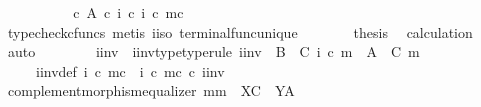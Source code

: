 \begin{isabellebody}
\ \ \ \ \isamarkupfalse%
\ \isamarkupfalse%
\ {\isachardoublequoteopen}{\isachardot}{\kern0pt}{\isachardot}{\kern0pt}{\isachardot}{\kern0pt}\ {\isacharequal}{\kern0pt}\ {\isasymf}\ {\isasymcirc}\isactrlsub c\ {\isasymbeta}\isactrlbsub A\isactrlesub \ {\isasymcirc}\isactrlsub c\ {\isacharparenleft}{\kern0pt}i\isactrlbold {\isasyminverse}\ {\isasymcirc}\isactrlsub c\ {\isacharparenleft}{\kern0pt}i\ {\isasymcirc}\isactrlsub c\ m{\isacharparenright}{\kern0pt}\isactrlsup c{\isacharparenright}{\kern0pt}{\isachardoublequoteclose}\isanewline
\ \ \ \ \ \ \isamarkupfalse%
\ {\isacharparenleft}{\kern0pt}typecheck{\isacharunderscore}{\kern0pt}cfuncs{\isacharcomma}{\kern0pt}\ metis\ i{\isacharunderscore}{\kern0pt}iso\ terminal{\isacharunderscore}{\kern0pt}func{\isacharunderscore}{\kern0pt}unique{\isacharparenright}{\kern0pt}\isanewline
\ \ \ \ \isamarkupfalse%
\ \isamarkupfalse%
\ {\isacharquery}{\kern0pt}thesis\ \isamarkupfalse%
\ calculation\ \isamarkupfalse%
\ auto\isanewline
\ \ \isamarkupfalse%
\isanewline
\ \ \isamarkupfalse%
\ \isamarkupfalse%
\ i{\isacharprime}{\kern0pt}{\isacharunderscore}{\kern0pt}inv\ \ i{\isacharprime}{\kern0pt}{\isacharunderscore}{\kern0pt}inv{\isacharunderscore}{\kern0pt}type{\isacharbrackleft}{\kern0pt}type{\isacharunderscore}{\kern0pt}rule{\isacharbrackright}{\kern0pt}{\isacharcolon}{\kern0pt}\ {\isachardoublequoteopen}i{\isacharprime}{\kern0pt}{\isacharunderscore}{\kern0pt}inv\ {\isacharcolon}{\kern0pt}\ B\ {\isasymsetminus}\ {\isacharparenleft}{\kern0pt}C{\isacharcomma}{\kern0pt}\ i\ {\isasymcirc}\isactrlsub c\ m{\isacharparenright}{\kern0pt}\ {\isasymrightarrow}\ A\ {\isasymsetminus}\ {\isacharparenleft}{\kern0pt}C{\isacharcomma}{\kern0pt}\ m{\isacharparenright}{\kern0pt}{\isachardoublequoteclose}\isanewline
\ \ \ \ \ i{\isacharprime}{\kern0pt}{\isacharunderscore}{\kern0pt}inv{\isacharunderscore}{\kern0pt}def{\isacharcolon}{\kern0pt}\ {\isachardoublequoteopen}{\isacharparenleft}{\kern0pt}i\ {\isasymcirc}\isactrlsub c\ m{\isacharparenright}{\kern0pt}\isactrlsup c\ {\isacharequal}{\kern0pt}\ {\isacharparenleft}{\kern0pt}i\ {\isasymcirc}\isactrlsub c\ m\isactrlsup c{\isacharparenright}{\kern0pt}\ {\isasymcirc}\isactrlsub c\ i{\isacharprime}{\kern0pt}{\isacharunderscore}{\kern0pt}inv{\isachardoublequoteclose}\isanewline
\ \ \ \ \isamarkupfalse%
\ complement{\isacharunderscore}{\kern0pt}morphism{\isacharunderscore}{\kern0pt}equalizer{\isacharbrackleft}{\kern0pt}\ m{\isacharequal}{\kern0pt}{\isachardoublequoteopen}m{\isachardoublequoteclose}{\isacharcomma}{\kern0pt}\ \ X{\isacharequal}{\kern0pt}C{\isacharcomma}{\kern0pt}\ \ Y{\isacharequal}{\kern0pt}A{\isacharbrackright}{\kern0pt}\ \isamarkupfalse%

\end{isabellebody}
